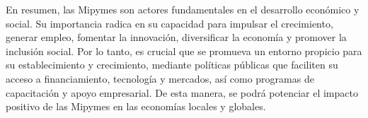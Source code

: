 \documentclass{article}
\begin{document}
	En resumen, las Mipymes son actores fundamentales en el desarrollo económico y social. Su importancia radica en su capacidad para impulsar el crecimiento, generar empleo, fomentar la innovación, diversificar la economía y promover la inclusión social. Por lo tanto, es crucial que se promueva un entorno propicio para su establecimiento y crecimiento, mediante políticas públicas que faciliten su acceso a financiamiento, tecnología y mercados, así como programas de capacitación y apoyo empresarial. De esta manera, se podrá potenciar el impacto positivo de las Mipymes en las economías locales y globales.
	
	
\end{document}
